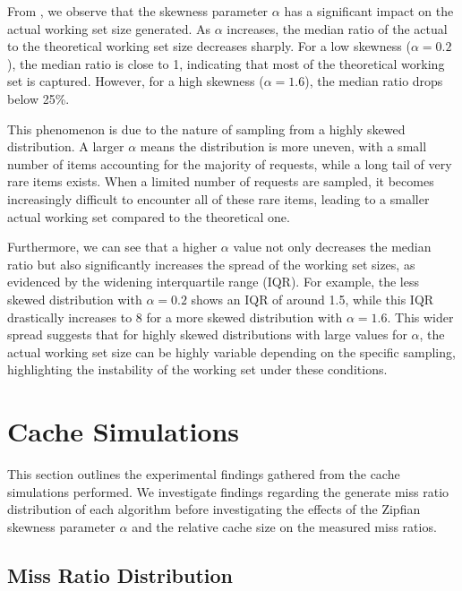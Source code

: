 From , we observe that the skewness parameter $\alpha$ has a significant impact on the actual working set size generated. As $\alpha$ increases, the median ratio of the actual to the theoretical working set size decreases sharply. For a low skewness ($\alpha=0.2$), the median ratio is close to 1, indicating that most of the theoretical working set is captured. However, for a high skewness ($\alpha=1.6$), the median ratio drops below 25\%.

This phenomenon is due to the nature of sampling from a highly skewed distribution. A larger $\alpha$ means the distribution is more uneven, with a small number of items accounting for the majority of requests, while a long tail of very rare items exists. When a limited number of requests are sampled, it becomes increasingly difficult to encounter all of these rare items, leading to a smaller actual working set compared to the theoretical one.

Furthermore, we can see that a higher $\alpha$ value not only decreases the median ratio but also significantly increases the spread of the working set sizes, as evidenced by the widening interquartile range (IQR). For example, the less skewed distribution with $\alpha=0.2$ shows an IQR of around 1.5, while this IQR drastically increases to 8 for a more skewed distribution with $\alpha=1.6$. This wider spread suggests that for highly skewed distributions with large values for $\alpha$, the actual working set size can be highly variable depending on the specific sampling, highlighting the instability of the working set under these conditions.





\section{Cache Simulations}\label{res:cache-sim}

This section outlines the experimental findings gathered from the cache simulations performed. We investigate findings regarding the generate miss ratio distribution of each algorithm before investigating the effects of the Zipfian skewness parameter $\alpha$ and the relative cache size on the measured miss ratios.

\subsection{Miss Ratio Distribution}\label{results:miss-ratio-distribution}

